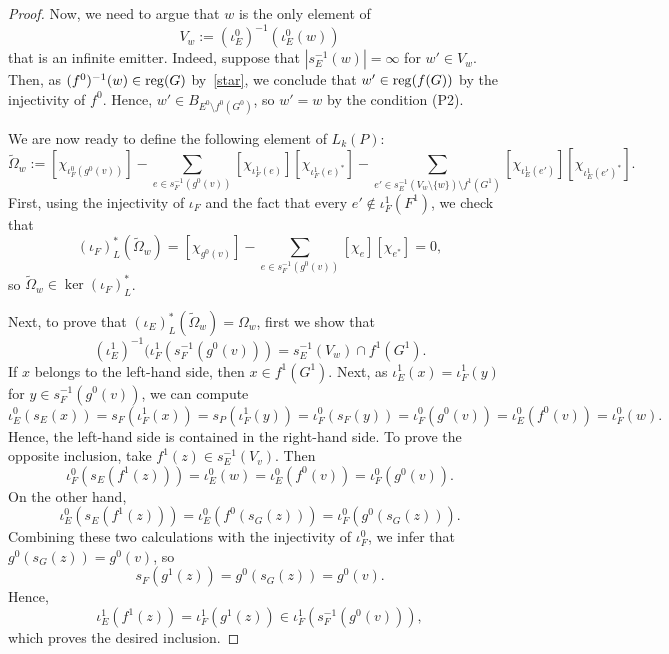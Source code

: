 \documentclass[12pt,times,a4paper]{amsart}
\numberwithin{equation}{section}
\numberwithin{equation}{section}
\begin{document}
\begin{proof}
Now, we need to argue that $w$ is the only element of
\begin{equation}
V_w:=(\iota_E^0)^{-1}(\iota_E^0(w))
\end{equation}
that is an infinite emitter. Indeed, suppose that $|s_E^{-1}(w)|=\infty$ for $w'\in V_w$. Then, as $(f^0)^{-1}(w)\in {\rm reg}(G)$ by~\eqref{star}, we 
conclude that $w'\in {\rm reg}(f(G))$ by the injectivity of $f^0$. Hence, $w'\in B_{E^0\setminus f^0(G^0)}$, so $w'=w$ by the condition (P2).

We are now ready to define the following element of $L_k(P)$:
\begin{equation}
\widetilde{\Omega}_w:=
[\chi_{\iota_F^0(g^0(v))}]-\!\!\!\!\!\!\!\sum_{e\in s_F^{-1}(g^0(v))}\!\!\!\!\!\!\![\chi_{\iota_F^1(e)}][\chi_{\iota_F^1(e)^*}]-
\!\!\!\!\!\!\!\!\!\!\!\!\!\!\!\!\!\sum_{e'\in s_E^{-1}(V_w\setminus\{w\})\setminus 
f^1(G^1)}\!\!\!\!\!\!\!\!\!\!\!\!\!\!\!\!\![\chi_{\iota_E^1(e')}][\chi_{\iota_E^1(e')^*}].
\end{equation}
First, using the injectivity of $\iota_F$ and the fact that every $e'\notin\iota_F^1(F^1)$, we check that
\begin{equation}
(\iota_F)^*_L(\widetilde{\Omega}_w)=[\chi_{g^0(v)}]-\!\!\!\!\!\!\!\sum_{e\in s_F^{-1}(g^0(v))}\!\!\!\!\!\!\![\chi_e][\chi_{e^*}]=0,
\end{equation}
so $\widetilde{\Omega}_w\in\ker(\iota_F)^*_L$. 

Next, to prove that $(\iota_E)^*_L(\widetilde{\Omega}_w)=\Omega_w$, first we show that
\begin{equation}\label{doublestar}
(\iota_E^1)^{-1}(\iota_F^1(s_F^{-1}(g^0(v)))=s_E^{-1}(V_w)\cap f^1(G^1).
\end{equation}
If $x$ belongs to the left-hand side, then $x\in f^1(G^1)$. Next, as $\iota_E^1(x)=\iota_F^1(y)$ for $y\in s_F^{-1}(g^0(v))$, we can compute
\begin{equation}
\iota^0_E(s_E(x))=s_F(\iota_F^1(x))=
s_P(\iota_F^1(y))=\iota_F^0(s_F(y))=\iota_F^0(g^0(v))=\iota_E^0(f^0(v))=\iota_F^0(w).
\end{equation}
Hence, the left-hand side is contained in the right-hand side. To prove the opposite inclusion, take 
$f^1(z)\in s_E^{-1}(V_v)$. Then \begin{equation}\iota_F^0(s_E(f^1(z)))=\iota_E^0(w)=\iota_E^0(f^0(v))=\iota_F^0(g^0(v)).
\end{equation}
On the other hand,
\begin{equation}
\iota_E^0(s_E(f^1(z)))=\iota_E^0(f^0(s_G(z)))=\iota_F^0(g^0(s_G(z))).
\end{equation}
Combining these two calculations with the injectivity of $\iota_F^0$, we infer that $g^0(s_G(z))=g^0(v)$, so 
\begin{equation}
s_F(g^1(z))=g^0(s_G(z))=g^0(v).
\end{equation}
Hence,
\begin{equation}
\iota_E^1(f^1(z))=\iota_F^1(g^1(z))\in\iota_F^1(s_F^{-1}(g^0(v))),
\end{equation}
which proves the desired inclusion.


\end{proof}
\end{document}
